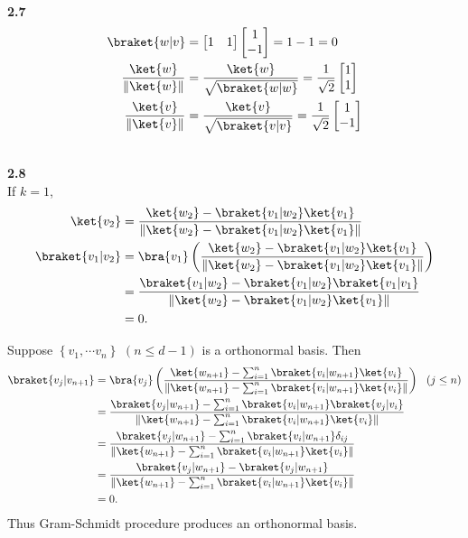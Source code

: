 \documentclass[10pt]{book}
\newcommand{\norm}[1]{\left\lVert#1\right\rVert} %
\newcommand{\Textbf}[1]{\hspace{3mm}\\ \textbf{#1}\\}
\begin{document}
	
	\Textbf{2.7}
	
	\begin{equation}
\begin{aligned}
		\braket{w | v} &= \begin{bmatrix}
			1 & 1
		\end{bmatrix}
		\begin{bmatrix}
			1 \\
			-1
		\end{bmatrix}
		= 1 - 1 = 0\\
		\frac{\ket{w}}{\norm{\ket{w}}} &=
		\frac{\ket{w}}{\sqrt{\braket{w|w}}} = \frac{1}{\sqrt{2}} \begin{bmatrix}
			1 \\
			1
		\end{bmatrix}\\
		\frac{\ket{v}}{\norm{\ket{v}}} &=
		\frac{\ket{v}}{\sqrt{\braket{v|v}}} = \frac{1}{\sqrt{2}} \begin{bmatrix}
			1 \\
			-1
		\end{bmatrix}
	\end{aligned}
\end{equation}
	
	
	
	\Textbf{2.8}
	
	If $k = 1$,
	\begin{equation}
\begin{aligned}
		\ket{v_2} &= \frac{\ket{w_2} - \braket{v_1 | w_2}\ket{v_1}}{\norm{\ket{w_2} - \braket{v_1 | w_2}\ket{v_1}}}\\
		\braket{v_1 | v_2} &= \bra{v_1} \left(\frac{\ket{w_2} - \braket{v_1 | w_2}\ket{v_1}}{\norm{\ket{w_2} - \braket{v_1 | w_2}\ket{v_1}}}\right)\\
		&= \frac{\braket{v_1 | w_2} - \braket{v_1 | w_2}\braket{v_1 | v_1}}{\norm{\ket{w_2} - \braket{v_1 | w_2}\ket{v_1}}}\\
		&= 0.
	\end{aligned}
\end{equation}
	
	Suppose $\left\{v_1, \cdots v_n \right\}$ $(n \leq d-1)$ is a orthonormal basis. Then
	\begin{equation}
\begin{aligned}
		\braket{v_j | v_{n+1}} &= \bra{v_j} \left(\frac{\ket{w_{n+1}} - \sum_{i=1}^{n}\braket{v_i | w_{n+1}}\ket{v_i}}{\norm{\ket{w_{n+1}} - \sum_{i=1}^{n}\braket{v_i | w_{n+1}}\ket{v_i}}}\right)~~(j \leq n)\\
		&= \frac{\braket{v_j | w_{n+1}} - \sum_{i=1}^{n}\braket{v_i | w_{n+1}}\braket{v_j | v_i}}{\norm{\ket{w_{n+1}} - \sum_{i=1}^{n}\braket{v_i | w_{n+1}}\ket{v_i}}}\\
		&= \frac{\braket{v_j | w_{n+1}} - \sum_{i=1}^{n}\braket{v_i | w_{n+1}}\delta_{ij}}{\norm{\ket{w_{n+1}} - \sum_{i=1}^{n}\braket{v_i | w_{n+1}}\ket{v_i}}}\\
		&= \frac{\braket{v_j | w_{n+1}} - \braket{v_j | w_{n+1}}}{\norm{\ket{w_{n+1}} - \sum_{i=1}^{n}\braket{v_i | w_{n+1}}\ket{v_i}}}\\
		&= 0.
	\end{aligned}
\end{equation}
	Thus Gram-Schmidt procedure produces an orthonormal basis.
	
\end{document}
